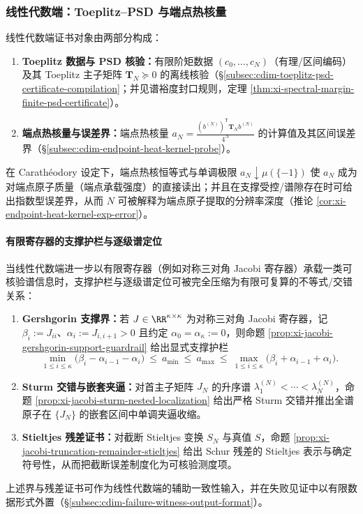 \subsubsection{线性代数端：Toeplitz--PSD 与端点热核量}\label{subsubsec:cdim-three-end-linear}
线性代数端证书对象由两部分构成：
\begin{enumerate}
  \item \textbf{Toeplitz 数据与 PSD 核验：}有限阶矩数据 \((c_0,\dots,c_N)\)（有理/区间编码）及其 Toeplitz 主子矩阵 \(\mathbf{T}_N\succeq 0\) 的离线核验（\S\ref{subsec:cdim-toeplitz-psd-certificate-compilation}；并见谱裕度封口规则，定理 \ref{thm:xi-spectral-margin-finite-psd-certificate}）。
  \item \textbf{端点热核量与误差界：}端点热核量 \(a_N=\frac{(b^{(N)})^{\mathsf T}\mathbf{T}_N b^{(N)}}{4^N}\) 的计算值及其区间误差界（\S\ref{subsec:cdim-endpoint-heat-kernel-probe}）。
\end{enumerate}
在 Carath\'eodory 设定下，端点热核恒等式与单调极限 \(a_N\downarrow\mu(\{-1\})\) 使 \(a_N\) 成为对端点原子质量（端点承载强度）的直接读出；并且在支撑受控/谱隙存在时可给出指数型误差界，从而 \(N\) 可被解释为端点原子提取的分辨率深度（推论 \ref{cor:xi-endpoint-heat-kernel-exp-error}）。

\paragraph{有限寄存器的支撑护栏与逐级谱定位}\label{subsec:cdim-jacobi-certificate-guards}
当线性代数端进一步以有限寄存器（例如对称三对角 Jacobi 寄存器）承载一类可核验谱信息时，支撑护栏与逐级谱定位可被完全压缩为有限可复算的不等式/交错关系：
\begin{enumerate}
  \item \textbf{Gershgorin 支撑界：}若 \(J\in\RR^{\kappa\times\kappa}\) 为对称三对角 Jacobi 寄存器，记 \(\beta_i:=J_{ii}\)、\(\alpha_i:=J_{i,i+1}>0\) 且约定 \(\alpha_0=\alpha_\kappa:=0\)，则命题 \ref{prop:xi-jacobi-gershgorin-support-guardrail} 给出显式支撑护栏
  \[
  \min_{1\le i\le \kappa}\bigl(\beta_i-\alpha_{i-1}-\alpha_i\bigr)
  \ \le\ a_{\min}\ \le\ a_{\max}\ \le\
  \max_{1\le i\le \kappa}\bigl(\beta_i+\alpha_{i-1}+\alpha_i\bigr).
  \]
  \item \textbf{Sturm 交错与嵌套夹逼：}对首主子矩阵 \(J_N\) 的升序谱 \(\lambda^{(N)}_1<\cdots<\lambda^{(N)}_N\)，命题 \ref{prop:xi-jacobi-sturm-nested-localization} 给出严格 Sturm 交错并推出全谱原子在 \(\{J_N\}\) 的嵌套区间中单调夹逼收缩。
  \item \textbf{Stieltjes 残差证书：}对截断 Stieltjes 变换 \(S_N\) 与真值 \(S\)，命题 \ref{prop:xi-jacobi-truncation-remainder-stieltjes} 给出 Schur 残差的 Stieltjes 表示与确定符号性，从而把截断误差制度化为可核验测度项。
\end{enumerate}
上述界与残差证书可作为线性代数端的辅助一致性输入，并在失败见证中以有限数据形式外置（\S\ref{subsec:cdim-failure-witness-output-format}）。

